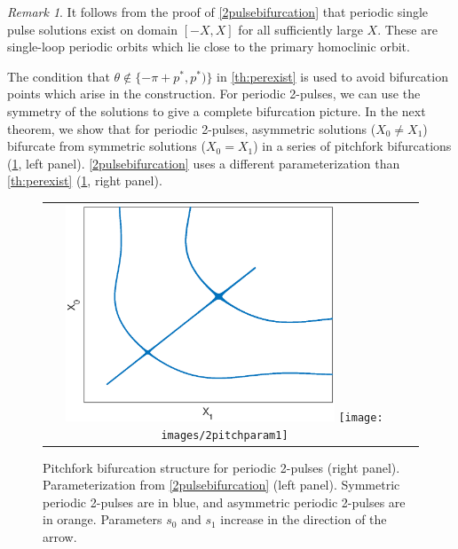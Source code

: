 \documentclass[10pt,reqno]{amsart}
\theoremstyle{plain}
\theoremstyle{definition}
\theoremstyle{remark}
\newtheorem{remark}[theorem]{Remark}
\numberwithin{theorem}{section}
\numberwithin{equation}{section}
\begin{document}
\begin{remark}
It follows from the proof of \cref{2pulsebifurcation} that periodic single pulse solutions exist on domain $[-X, X]$ for all sufficiently large $X$. These are single-loop periodic orbits which lie close to the primary homoclinic orbit.
\end{remark}

The condition that $\theta \notin \{-\pi + p^*, p^*) \}$ in \cref{th:perexist} is used to avoid bifurcation points which arise in the construction. For periodic 2-pulses, we can use the symmetry of the solutions to give a complete bifurcation picture. In the next theorem, we show that for periodic 2-pulses, asymmetric solutions ($X_0 \neq X_1$) bifurcate from symmetric solutions ($X_0 = X_1$) in a series of pitchfork bifurcations (\cref{fig:2pitch}, left panel). \cref{2pulsebifurcation} uses a different parameterization than \cref{th:perexist} (\cref{fig:2pitch}, right panel).

\begin{figure}[H]
\begin{center}
\begin{tabular}{cc}
\includegraphics[width=8cm]{images/2pitchfork.eps}
\texttt{[image: images/2pitchparam1]}
\end{tabular}
\end{center}
\caption[Pitchfork bifurcation structure for periodic 2-pulses]{Pitchfork bifurcation structure for periodic 2-pulses (right panel). Parameterization from \cref{2pulsebifurcation} (left panel). Symmetric periodic 2-pulses are in blue, and asymmetric periodic 2-pulses are in orange. Parameters $s_0$ and $s_1$ increase in the direction of the arrow.}
\label{fig:2pitch}
\end{figure} 
\end{document}
